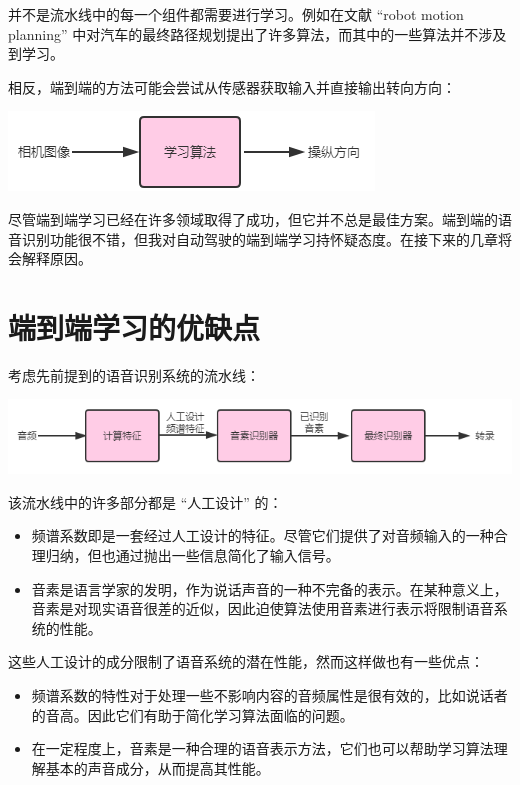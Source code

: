 并不是流水线中的每一个组件都需要进行学习。例如在文献 ``robot motion
planning''
中对汽车的最终路径规划提出了许多算法，而其中的一些算法并不涉及到学习。

相反，端到端的方法可能会尝试从传感器获取输入并直接输出转向方向：

\includegraphics{./img/ch48_04.png}

尽管端到端学习已经在许多领域取得了成功，但它并不总是最佳方案。端到端的语音识别功能很不错，但我对自动驾驶的端到端学习持怀疑态度。在接下来的几章将会解释原因。

\hypertarget{ux7aefux5230ux7aefux5b66ux4e60ux7684ux4f18ux7f3aux70b9}{%
\chapter{端到端学习的优缺点}\label{ux7aefux5230ux7aefux5b66ux4e60ux7684ux4f18ux7f3aux70b9}}

考虑先前提到的语音识别系统的流水线：

\includegraphics{./img/ch48_01.png}

该流水线中的许多部分都是 ``人工设计'' 的：

\begin{itemize}
\tightlist
\item
  频谱系数即是一套经过人工设计的特征。尽管它们提供了对音频输入的一种合理归纳，但也通过抛出一些信息简化了输入信号。
\item
  音素是语言学家的发明，作为说话声音的一种不完备的表示。在某种意义上，音素是对现实语音很差的近似，因此迫使算法使用音素进行表示将限制语音系统的性能。
\end{itemize}

这些人工设计的成分限制了语音系统的潜在性能，然而这样做也有一些优点：

\begin{itemize}
\tightlist
\item
  频谱系数的特性对于处理一些不影响内容的音频属性是很有效的，比如说话者的音高。因此它们有助于简化学习算法面临的问题。
\item
  在一定程度上，音素是一种合理的语音表示方法，它们也可以帮助学习算法理解基本的声音成分，从而提高其性能。
\end{itemize}

